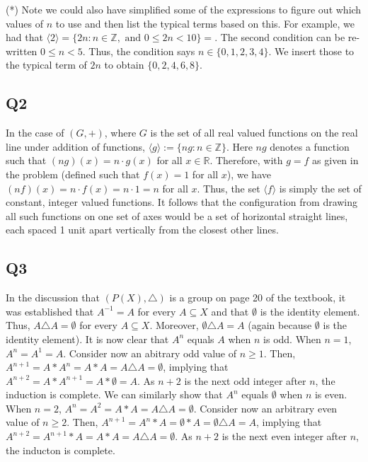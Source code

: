\documentclass[12pt]{article}
\def\Z{{\mathbb Z}}        %
\def\R{{\mathbb R}}        %
\numberwithin{theorem}{section}
\numberwithin{equation}{section}
\numberwithin{remark}{section}
\numberwithin{definition}{section}
\numberwithin{theorem}{section}
\numberwithin{lemma}{section}
\numberwithin{example}{section}
\begin{document}
\vspace{\baselineskip}

\noindent (*) Note we could also have simplified some of the expressions to figure out which values of $n$ to use and then list the typical terms based on this. For example, we had that $\langle 2 \rangle=\{2n:n\in\Z,\text{ and }0\le 2n<10\}=$. The second condition can be re-written $0\le n < 5$. Thus, the condition says $n\in\{0,1,2,3,4\}$. We insert those to the typical term of $2n$ to obtain $\{0,2,4,6,8\}$.





\subsection{Q2}

In the case of $(G,+)$, where $G$ is the set of all real valued functions on the real line under addition of functions, $\langle g \rangle:=\{ng:n\in\Z\}$. Here $ng$ denotes a function such that $(ng)(x) = n\cdot g(x)$ for all $x\in\R$.  Therefore, with $g=f$ as given in the problem (defined such that $f(x)=1$ for all $x$), we have $(nf)(x)=n\cdot f(x)=n\cdot1=n$ for all $x$. Thus, the set $\langle f \rangle$ is simply the set of constant, integer valued functions. It follows that the configuration from drawing all such functions on one set of axes would be a set of horizontal straight lines, each spaced 1 unit apart vertically from the closest other lines. 



\subsection{Q3}

In the discussion that $\left(P(X),\triangle\right)$ is a group on page 20 of the textbook, it was established that $A^{-1}=A$ for every $A\subseteq X$ and that $\emptyset$ is the identity element. Thus, $A\triangle A = \emptyset$ for every $A\subseteq X$. Moreover, $\emptyset\triangle A = A$ (again because $\emptyset$ is the identity element). It is now clear that $A^n$ equals $A$ when $n$ is odd. When $n=1$, $A^n=A^1=A$. Consider now an abitrary odd value of $n\ge1$. Then, $A^{n+1}=A*A^n=A*A=A\triangle A = \emptyset$, implying that $A^{n+2}=A*A^{n+1}=A*\emptyset=A$. As $n+2$ is the next odd integer after $n$, the induction is complete. We can similarly show that $A^n$ equals $\emptyset$ when $n$ is even. When $n=2$, $A^n=A^2=A*A=A\triangle A = \emptyset$. Consider now an arbitrary even value of $n\ge 2$. Then, $A^{n+1}=A^n*A=\emptyset*A=\emptyset\triangle A=A$, implying that $A^{n+2}=A^{n+1}*A=A*A=A\triangle A=\emptyset$. As $n+2$ is the next even integer after $n$, the inducton is complete. 
\end{document}
